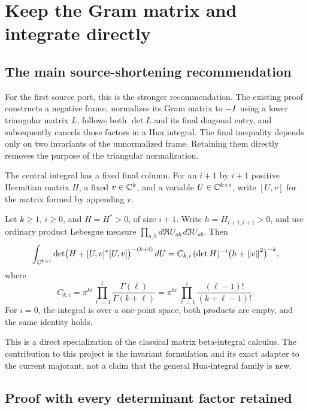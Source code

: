 \section{Keep the Gram matrix and integrate directly}\label{sec:hua}

\subsection{The main source-shortening recommendation}

For the first source port, this is the stronger recommendation. The existing proof
constructs a negative frame, normalizes its Gram matrix to \(-I\) using a lower
triangular matrix \(L\), follows both \(\det L\) and its final diagonal entry,
and subsequently cancels those factors in a Hua integral. The final inequality
depends only on two invariants of the unnormalized frame. Retaining them directly
removes the purpose of the triangular normalization.

The central integral has a fixed final column. For an \(i+1\) by \(i+1\) positive
Hermitian matrix \(H\), a fixed \(v\in\mathbb C^k\), and a variable \(U\in\mathbb C^{k\times i}\),
write \([U,v]\) for the matrix formed by appending \(v\).

\begin{theorem}\label{thm:hua}
Let \(k\geq1\), \(i\geq0\), and \(H=H^*>0\), of size \(i+1\).
Write \(h=H_{i+1,i+1}>0\), and use ordinary product Lebesgue measure
\(\prod_{a,b}d\Re U_{ab}\,d\Im U_{ab}\). Then
\begin{equation}\label{eq:hua}
 \int_{\mathbb C^{k\times i}}
   \det\bigl(H+[U,v]^*[U,v]\bigr)^{-(k+i)}\,dU
 =C_{k,i}\,(\det H)^{-i}\bigl(h+\left\lVert v\right\rVert^2\bigr)^{-k},
\end{equation}
where
\begin{equation}\label{eq:hua-constant}
 C_{k,i}=\pi^{ki}\prod_{\ell=1}^{i}\frac{\Gamma(\ell)}{\Gamma(k+\ell)}
        =\pi^{ki}\prod_{\ell=1}^{i}\frac{(\ell-1)!}{(k+\ell-1)!}.
\end{equation}
For \(i=0\), the integral is over a one-point space, both products are empty,
and the same identity holds.
\end{theorem}

This is a direct specialization of the classical matrix beta-integral calculus.
The contribution to this project is the invariant formulation and its exact adapter
to the current majorant, not a claim that the general Hua-integral family is new.

\subsection{Proof with every determinant factor retained}

